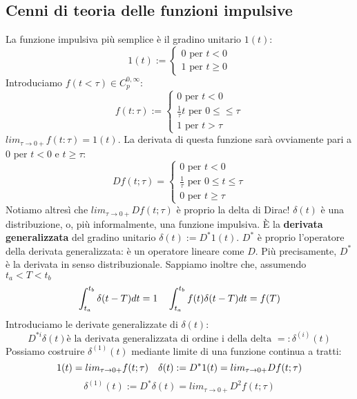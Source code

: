 \documentclass[11pt]{article}
\begin{document}
\subsection{Cenni di teoria delle funzioni impulsive}
La funzione impulsiva più semplice è il gradino unitario $1(t)$:
\begin{displaymath}
    1(t) := \begin{cases}
        0 \textrm{ per }t<0 \\
        1 \textrm{ per }t\ge0
    \end{cases}
\end{displaymath}
Introduciamo $f(t<\tau) \in C_p^{0,\infty}$:
\begin{displaymath}
    f(t:\tau) :=
    \begin{cases}
        0 \textrm{ per } t<0                         \\
        \frac{1}{\tau} t \textrm{ per }0\le \le \tau \\
        1 \textrm{ per }t>\tau
    \end{cases}
\end{displaymath}
$lim_{\tau \rightarrow 0+} f(t:\tau) = 1(t)$.
La derivata di questa funzione sarà ovviamente pari a 0 per $t<0$ e $t\ge\tau$:
\begin{displaymath}
    Df(t;\tau) =
    \begin{cases}
        0 \textrm{ per } t<0                          \\
        \frac{1}{\tau} \textrm{ per } 0\le t \le \tau \\
        0 \textrm{ per }t\ge\tau
    \end{cases}
\end{displaymath}
Notiamo altresì che $lim_{\tau\rightarrow 0+} Df(t;\tau)$ è proprio la delta di Dirac!
$\delta(t)$ è una distribuzione, o, più informalmente, una funzione impulsiva. È la \textbf{derivata generalizzata} del gradino unitario $\delta(t) := D^*1(t)$. $D^*$ è proprio l'operatore della derivata generalizzata: è un operatore lineare come $D$. Più precisamente, $D^*$ è la derivata in senso distribuzionale. Sappiamo inoltre che, assumendo $t_a < T < t_b$
\begin{displaymath}
    \int_{t_a}^{t_b} \delta(t-T)dt = 1 \hspace{10px} \int_{t_a}^{t_b} f(t)\delta(t-T)dt = f(T)
\end{displaymath}
Introduciamo le derivate generalizzate di $\delta(t)$:
\begin{displaymath}
    D^{*i}\delta(t) \textrm{è la derivata generalizzata di ordine i della delta } =: \delta^{(i)}(t)
\end{displaymath}
Possiamo costruire $\delta^{(1)}(t)$ mediante limite di una funzione continua a tratti:
\begin{displaymath}
    1(t) = lim_{\tau\rightarrow0+}f(t;\tau) \hspace{10px} \delta(t):= D^* 1(t) = lim_{\tau\rightarrow0+} Df(t;\tau)
\end{displaymath}
\begin{displaymath}
    \delta^{(1)} (t) := D^* \delta(t) = lim_{\tau\rightarrow0+}D^2 f(t;\tau)
\end{displaymath}
\end{document}
